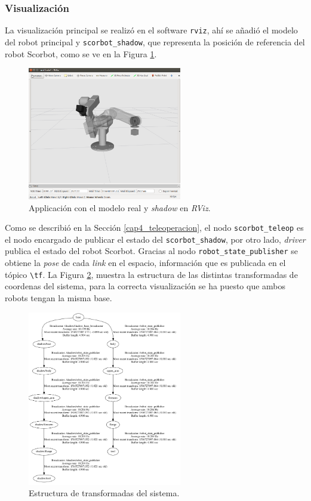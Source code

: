 \subsubsection{Visualización}

La visualización principal se realizó en el software \texttt{rviz}, ahí se añadió el modelo del robot principal y \texttt{scorbot\_shadow}, que representa la posición de referencia del robot Scorbot, como se ve en la Figura \ref{cap4_scorbot_shadow}.

\begin{figure}[H]
  \centering
  \includegraphics[width=0.6\textwidth]{img/cap4/scorbot_shadow.png}
  \caption{Applicación con el modelo real y \textit{shadow} en \textit{RViz}.}
  \label{cap4_scorbot_shadow}
\end{figure}

Como se describió en la Sección \ref{cap4_teleoperacion}, el nodo \texttt{scorbot\_teleop} es el nodo encargado de publicar el estado del \texttt{scorbot\_shadow}, por otro lado, \textit{driver} publica el estado del robot Scorbot. Gracias al nodo \texttt{robot\_state\_publisher} se obtiene la \textit{pose} de cada \textit{link} en el espacio, información que es publicada en el tópico \texttt{\textbackslash tf}. La Figura \ref{cap4_tf}, muestra la estructura de las distintas transformadas de coordenas del sistema, para la correcta visualización se ha puesto que ambos robots tengan la misma base. 

\begin{figure}[H]
  \centering
  \includegraphics[width=0.6\textwidth]{img/cap4/tf.png}
  \caption{Estructura de transformadas del sistema.}
  \label{cap4_tf}
\end{figure}
